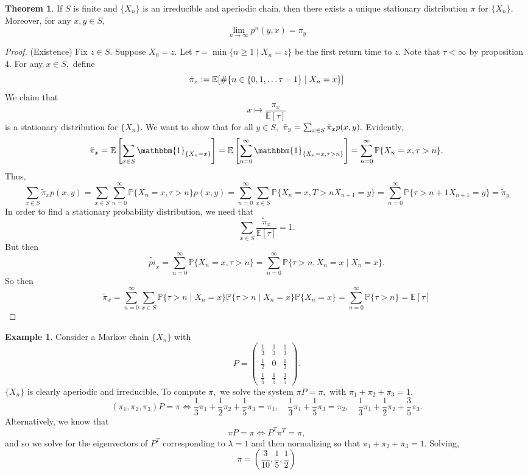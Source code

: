 \documentclass[10pt, oneside]{article}
\newcommand{\bbP}{\mathbb{P}}
\newcommand{\bbE}{\mathbb{E}}
\theoremstyle{definition}
\newtheorem{exmp}{Example}[section]
\newtheorem{thm}{Theorem}
\begin{document}
\begin{thm}
    If $S$ is finite and $\{X_n\}$ is an irreducible and aperiodic chain, then there exists a unique stationary distribution $\pi$ for $\{X_n\}.$ Moreover, for any $x,y \in S,$ \[\lim_{n\to \infty}p^n(y,x) = \pi_y\]
\end{thm}

\begin{proof}
    (Existence) Fix $z \in S.$ Suppose $X_0 = z.$ Let $\tau = \min\{n \geq 1 \mid X_n = z\}$ be the first return time to $z.$ Note that $\tau < \infty $ by proposition $4.$ For any $x\in S,$ define
    \[\Tilde{\pi}_x := \mathbb{E}[ \#\{n \in \{0,1, \dots \tau - 1\} \mid X_n = x\}]\] 
    We claim that 
    \[x \mapsto \frac{\pi_x}{\bbE[\tau]}\] is a stationary distribution for $\{X_n\}.$ We want to show that for all $y \in S,$ $\tilde{\pi}_y = \sum_{x\in S} \Tilde{\pi}_x p(x,y).$ Evidently, 
    \[\tilde{\pi}_x = \mathbb{E}\left[\sum_{x\in S}\mathbbm{1}_{\{X_n = x\}}\right] = \mathbb{E} \left[\sum_{n = 0}^\infty \mathbbm{1}_{\{X_n = x, \tau >n\}}\right] = \sum_{n =0}^\infty \bbP\{X_n = x, \tau >n\}.\] Thus, 
    \[\sum_{x\in S}\tilde{\pi}_x p(x,y) = \sum_{x\in S}\sum_{n = 0}^\infty \bbP\{X_n = x, \tau >n\} p(x,y) = \sum_{n = 0}^\infty \sum_{x\in S} \bbP\{X_n = x, T >n X_{n + 1}  = y\} = \sum_{n = 0}^\infty \bbP\{\tau >{n + 1}X_{n + 1} = y\} = \tilde{\pi}_y\]
    In order to find a stationary probability distribution, we need that 
    \[\sum_{x\in S} \frac{\tilde{\pi}_x}{\mathbb{E}[\tau]} = 1.\] But then 
    \[\tilde{pi}_x = \sum_{n = 0}^\infty \bbP\{X_n = x , \tau >n\} = \sum_{n = 0}^\infty \bbP\{\tau > n, X_n = x \mid X_n = x\}.\] So then 
    \[\tilde{\pi}_x  = \sum_{n  = 0}^\infty \sum_{x\in S}\bbP\{\tau > n  \mid X_n = x\}\bbP\{\tau  > n \mid X_n  = x\}\bbP\{X_n = x\} = \sum_{n = 0}^\infty \bbP\{\tau >n\} = \bbE[\tau]\]
\end{proof}

\begin{exmp}
    Consider a Markov chain $\{X_n\}$ with 
    \[P = \begin{pmatrix}
        \frac{1}{3} & \frac{1}{3} & \frac{1}{3}\\
        \frac{1}{2} & 0 & \frac{1}{2}\\
        \frac{1}{5} & \frac{1}{5} & \frac{3}{5}
    \end{pmatrix}.\] $\{X_n\}$ is clearly aperiodic and irreducible. To compute $\pi,$ we solve the system $\pi P  = \pi,$ with $\pi_1 + \pi_2  + \pi_3 = 1.$ 
    \[(\pi_1 , \pi_2 ,\pi_3) P  = \pi \iff \frac{1}{3}\pi_1 + \frac{1}{2}\pi_2 + \frac{1}{5}\pi_3 = \pi_1,\quad  \frac{1}{3}\pi_1 + \frac{1}{5}\pi_3  = \pi_2, \quad  \frac{1}{3}\pi_1 + \frac{1}{2}\pi_2 + \frac{3}{5}\pi_3.\] Alternatively, we know that 
    \[\pi P = \pi \iff P^T \pi^T=\pi,\] and so we solve for the eigenvectors of $P^T$ corresponding to $\lambda = 1$ and then normalizing so that $\pi_1 + \pi_2 + \pi_3 = 1.$
    Solving, 
    \[\pi = (\frac{3}{10}, \frac{1}{5}, \frac{1}{2})\]
\end{exmp}
\end{document}

